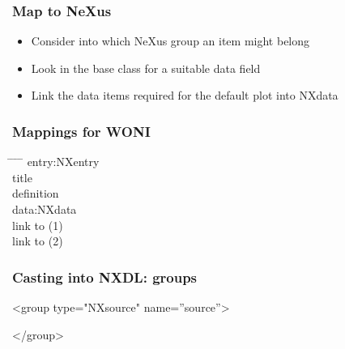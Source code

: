 \documentclass{beamer}
\begin{document}
\begin{frame}
\frametitle{Map to NeXus}
\begin{itemize}
\item Consider into which NeXus group an item might belong
\item Look in the base class for a suitable data field
\item Link the data items required for the default plot into NXdata
\end{itemize}
\end{frame}

\begin{frame} \frametitle{Mappings for WONI}
\begin{tabbing}
\hspace*{1cm} \= \hspace*{1cm} \= \hspace*{1cm} \= \hspace*{1cm} \= \kill
{} {
entry:NXentry \\
\>title\\
\>definition\\
}
 {
\>data:NXdata\\
\> \>link to (1)\\
\> \>link to (2)\\
}
 \end{tabbing}
\end{frame}

\begin{frame}[fragile]
\frametitle{Casting into NXDL: groups}
\begin{semiverbatim}
<group type="NXsource" name=''source''>

</group>
\end{semiverbatim}
\end{frame}
\end{document}
